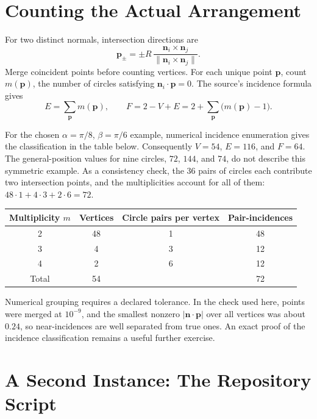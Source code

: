 \section{Counting the Actual Arrangement}

For two distinct normals, intersection directions are
\[
  \mathbf p_\pm=\pm R\,\frac{\mathbf n_i\times\mathbf n_j}{\|\mathbf n_i\times\mathbf n_j\|}.
\]
Merge coincident points before counting vertices. For each unique point $\mathbf p$, count $m(\mathbf p)$, the number of circles satisfying $\mathbf n_i\cdot\mathbf p=0$. The source's incidence formula gives
\[
  E=\sum_{\mathbf p}m(\mathbf p),\qquad
  F=2-V+E=2+\sum_{\mathbf p}\bigl(m(\mathbf p)-1\bigr).
\]

For the chosen $\alpha=\pi/8$, $\beta=\pi/6$ example, numerical incidence enumeration gives the classification in the table below. Consequently $V=54$, $E=116$, and $F=64$. The general-position values for nine circles, $72$, $144$, and $74$, do not describe this symmetric example. As a consistency check, the 36 pairs of circles each contribute two intersection points, and the multiplicities account for all of them: $48\cdot1+4\cdot3+2\cdot6=72$.

\begin{center}
\begin{tabular}{@{}cccc@{}}
\toprule
Multiplicity $m$ & Vertices & Circle pairs per vertex & Pair-incidences\\
\midrule
2 & 48 & 1 & 48\\
3 & 4 & 3 & 12\\
4 & 2 & 6 & 12\\
\midrule
Total & 54 & & 72\\
\bottomrule
\end{tabular}
\end{center}

Numerical grouping requires a declared tolerance. In the check used here, points were merged at $10^{-9}$, and the smallest nonzero $|\mathbf n\cdot\mathbf p|$ over all vertices was about $0.24$, so near-incidences are well separated from true ones. An exact proof of the incidence classification remains a useful further exercise.

\section{A Second Instance: The Repository Script}

